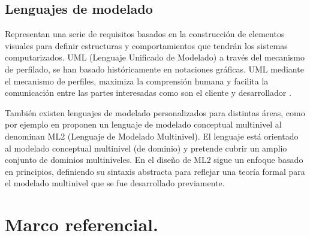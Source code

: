 \subsection{Lenguajes de modelado}
Representan una serie de requisitos basados en la construcción de elementos visuales para definir estructuras y comportamientos que tendrán los sistemas computarizados. UML (Lenguaje Unificado de Modelado) a través del mecanismo de perfilado, se han basado históricamente en notaciones gráficas. UML mediante el mecanismo de perfiles, maximiza la comprensión humana y facilita la comunicación entre las partes interesadas como son el cliente y desarrollador \cite{Blended}. 

También existen lenguajes de modelado personalizados para distintas áreas, como por ejemplo en \cite{Multi-level} proponen un lenguaje de modelado conceptual multinivel al denominan ML2 (Lenguaje de Modelado Multinivel). El lenguaje está orientado al modelado conceptual multinivel (de dominio) y pretende cubrir un amplio conjunto de dominios multiniveles. En el diseño de ML2 sigue un enfoque basado en principios, definiendo su sintaxis abstracta para reflejar una teoría formal para el modelado multinivel que se fue desarrollado previamente.


\section{Marco referencial.}